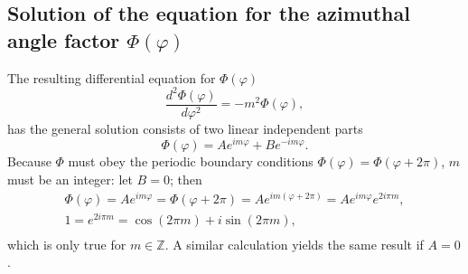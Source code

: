 \subsection{Solution of the equation  for the azimuthal angle factor $\Phi(\varphi )$}

The  resulting differential equation  for $\Phi(\varphi )$
\begin{equation}
\frac{   d   ^2\Phi(\varphi )}{   d    \varphi^2 }
=  -m^2\Phi(\varphi),
\label{2011-m-ch-qaephi}
\end{equation}
has the general solution consists of two linear independent parts
\begin{equation}
\Phi(\varphi) = A e^{im\varphi}+B e^{-im\varphi}.
\label{2011-m-ch-qae11}
\end{equation}
Because $\Phi$ must obey the periodic boundary conditions $\Phi(\varphi)=\Phi(\varphi  +2\pi)$,
$m$ must be an integer: let $B=0$; then
 \begin{equation}
\begin{split}
\Phi(\varphi)= Ae^{im\varphi} =\Phi(\varphi  +2\pi) = Ae^{im(\varphi  +2\pi)} = Ae^{im\varphi}e^{2i\pi m}  ,\\
1  =  e^{2i\pi m}  = \cos (2 \pi m) +i \sin (2 \pi m)  ,\\
\end{split}
\label{2018-mm-ch-sf-acin}
\end{equation}
which is only true for $m\in \mathbb{Z}$. A similar calculation yields the same result if $A=0$.


